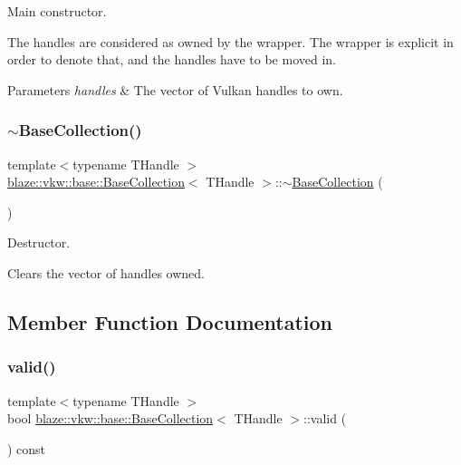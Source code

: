 Main constructor. 

The handles are considered as owned by the wrapper. The wrapper is explicit in order to denote that, and the handles have to be moved in.


\begin{DoxyParams}{Parameters}
{\em handles} & The vector of Vulkan handles to own. \\
\hline
\end{DoxyParams}
\mbox{\label{structblaze_1_1vkw_1_1base_1_1BaseCollection_a17dacc1364ad11abd1c3589980e8f689}} 
\subsubsection{\texorpdfstring{$\sim$\+Base\+Collection()}{~BaseCollection()}}
{\footnotesize\ttfamily template$<$typename T\+Handle $>$ \\
\hyperlink{structblaze_1_1vkw_1_1base_1_1BaseCollection}{blaze\+::vkw\+::base\+::\+Base\+Collection}$<$ T\+Handle $>$\+::$\sim$\hyperlink{structblaze_1_1vkw_1_1base_1_1BaseCollection}{Base\+Collection} (\begin{DoxyParamCaption}{ }\end{DoxyParamCaption})\hspace{0.3cm}{\ttfamily [inline]}}



Destructor. 

Clears the vector of handles owned. 

\subsection{Member Function Documentation}
\mbox{\label{structblaze_1_1vkw_1_1base_1_1BaseCollection_a16ba74b297d8f157b47fc1335e79fb88}} 
\subsubsection{\texorpdfstring{valid()}{valid()}}
{\footnotesize\ttfamily template$<$typename T\+Handle $>$ \\
bool \hyperlink{structblaze_1_1vkw_1_1base_1_1BaseCollection}{blaze\+::vkw\+::base\+::\+Base\+Collection}$<$ T\+Handle $>$\+::valid (\begin{DoxyParamCaption}{ }\end{DoxyParamCaption}) const\hspace{0.3cm}{\ttfamily [inline]}}



